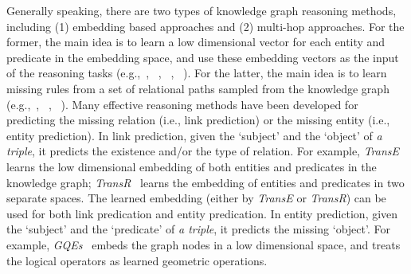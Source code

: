  Generally speaking, there are two types of knowledge graph reasoning methods, including (1) embedding based approaches and (2) multi-hop approaches. For the former, 
the main idea is to learn a low dimensional vector for each entity and predicate in the embedding space, and use these embedding vectors as the input of the reasoning tasks (e.g.,~\cite{transE}, ~\cite{rotatE}, ~\cite{entity-predicate}, ~\cite{pprop}).
For the latter, %
the main idea is to learn missing rules from a set of relational paths sampled from the knowledge graph (e.g.,~\cite{williamCohen}, ~\cite{willianWang}, ~\cite{das-etal-2017-chains}). Many effective reasoning methods have been developed for predicting the missing relation (i.e., link prediction) or the missing entity (i.e., entity prediction). 
In link prediction, given the `subject' and the `object' of {\em a triple}, it predicts the existence and/or the type of relation. 
For example,
{\em TransE}~\cite{transE} learns the low dimensional embedding of both entities and predicates in the knowledge graph; %
{\em TransR}~\cite{Lin2015TransR} learns the embedding of entities and predicates in two separate spaces. 
The learned embedding (either by {\em TransE} or {\em TransR}) can be used for both link predication and entity predication. 
In entity prediction, given the `subject' and the `predicate' of {\em a triple}, it predicts the missing `object'. For example, 
{\em GQEs}~\cite{entity-predicate} embeds the graph nodes in a low dimensional space, and treats the logical operators as learned geometric operations.


